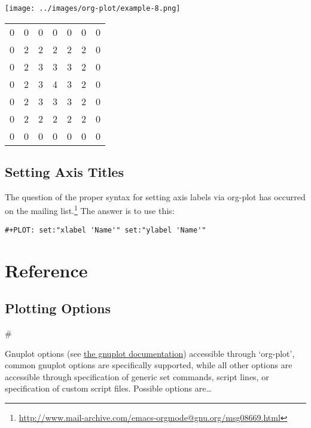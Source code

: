 \documentclass[11pt]{article}
\begin{document}
\begin{center}
\texttt{[image: ../images/org-plot/example-8.png]}
\end{center}

\begin{center}
\begin{tabular}{rrrrrrr}
0 & 0 & 0 & 0 & 0 & 0 & 0\\
0 & 2 & 2 & 2 & 2 & 2 & 0\\
0 & 2 & 3 & 3 & 3 & 2 & 0\\
0 & 2 & 3 & 4 & 3 & 2 & 0\\
0 & 2 & 3 & 3 & 3 & 2 & 0\\
0 & 2 & 2 & 2 & 2 & 2 & 0\\
0 & 0 & 0 & 0 & 0 & 0 & 0\\
\end{tabular}
\end{center}

\subsection*{Setting Axis Titles}
\label{sec:org3309eec}
The question of the proper syntax for setting axis labels via org-plot
has occurred on the mailing list.\footnote{\url{http://www.mail-archive.com/emacs-orgmode@gnu.org/msg08669.html}} The answer is to use this:
\begin{verbatim}
#+PLOT: set:"xlabel 'Name'" set:"ylabel 'Name'"
\end{verbatim}

\section*{Reference}
\label{sec:org17dfd9d}

\subsection*{Plotting Options}
\label{sec:org3a95429}
\#\label{org7dee608}

Gnuplot options (see \href{http://gnuplot.sourceforge.net/documentation.html}{the gnuplot documentation}) accessible through
`org-plot', common gnuplot options are specifically supported, while
all other options are accessible through specification of generic set
commands, script lines, or specification of custom script files.
Possible options are\ldots{}
\end{document}
